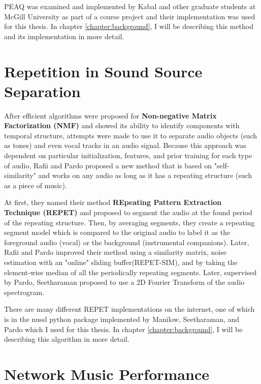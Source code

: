 PEAQ was examined and implemented by Kabal and other graduate students at McGill University as part of a course project\cite{kabal2002examination} and their implementation was used for this thesis. In chapter \ref{chapter:background}, I will be describing this method and its implementation in more detail.

\section{Repetition in Sound Source Separation}

After efficient algorithms were proposed for \textbf{Non-negative Matrix Factorization (NMF)}\cite{nmf} and showed its ability to identify components with temporal structure\cite{smaragdis2004non}, attempts were made to use it to separate audio objects (such as tones)\cite{smaragdis2004discovering} and even vocal tracks\cite{vembu2005separation} in an audio signal. Because this approach was dependent on particular initialization, features, and prior training for each type of audio, Rafii and Pardo proposed a new method that is based on "self-similarity" and works on any audio as long as it has a repeating structure (such as a piece of music). 

At first, they named their method \textbf{REpeating Pattern Extraction Technique (REPET)} and proposed to segment the audio at the found period of the repeating structure. Then, by averaging segments, they create a repeating segment model which is compared to the original audio to label it as the foreground audio (vocal) or the background (instrumental companions)\cite{rafii2011simple}. Later, Rafii and Pardo improved their method using a similarity matrix\cite{rafii_musicvoice_2012}, noise estimation with an "online" sliding buffer(REPET-SIM)\cite{rafii2013online}, and by taking the element-wise median of all the periodically repeating segments\cite{Rafii2013repet}. Later, supervised by Pardo, Seetharaman proposed to use a 2D Fourier Transform of the audio spectrogram\cite{seetharaman_musicvoice_2017}.

There are many different REPET implementations on the internet, one of which is in the nussl python package implemented by Manilow, Seetharaman, and Pardo\cite{nussl} which I used for this thesis. In chapter \ref{chapter:background}, I will be describing this algorithm in more detail.


\section{Network Music Performance}

